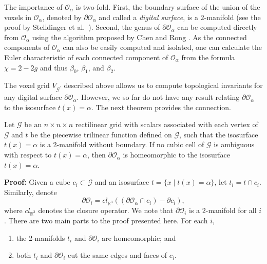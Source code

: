 The importance of $\mathcal{O}_\alpha$ is two-fold. First, the
boundary surface of the union of the voxels in $\mathcal{O}_\alpha$,
denoted by $\partial\mathcal{O}_\alpha$ and called a \emph{digital
  surface}, is a $2$-manifold (see the proof by Stelldinger et
al.~\cite{siqueira:2007}). Second, the genus of
$\partial\mathcal{O}_\alpha$ can be computed directly from
$\mathcal{O}_\alpha$ using the algorithm proposed by Chen and Rong
\cite{LiChen:2008}. As the
connected components of $\mathcal{O}_\alpha$ can also be easily
computed and isolated, one can calculate the Euler characteristic of
each connected component of $\mathcal{O}_\alpha$ from the formula
$\chi = 2 - 2g$ and thus $\beta_0$, $\beta_1$, and $\beta_2$.

The voxel grid $V_{\mathcal{G^\prime}}$ described above allows us to
compute topological invariants for any digital surface
$\partial\mathcal{O}_\alpha$. However, we so far do not have any
result relating $\partial\mathcal{O}_\alpha$ to the isosurface
$t(x)=\alpha$.  The next theorem provides the connection.

\begin{thm}
Let $\mathcal{G}$ be an $n\times n\times n$ rectilinear grid with scalars
associated with each vertex of $\mathcal{G}$ and $t$ be the piecewise trilinear 
function defined on $\mathcal{G}$, such that the isosurface $t(x)=\alpha$ is a
2-manifold without boundary. If no cubic cell of $\mathcal{G}$ is
ambiguous with respect to $t(x)=\alpha$, then $\partial\mathcal{O}_\alpha$
is homeomorphic to the isosurface $t(x)=\alpha$.
\label{thm:topological_equivalence_trilinear}
\end{thm}
{\bf Proof:} Given a cube $c_i \subset \mathcal{G}$ and an isosurface
 $t = \{x \;|\; t(x) = \alpha\}$, let $t_i = t \cap c_i$.  Similarly,
denote
\[\partial \mathcal{O}_i =  cl_{\mathbb{R}^3} \left( (\partial \mathcal{O}_\alpha \cap c_i) - \partial c_i  \right),\]
where $cl_{\mathbb{R}^3}$ denotes the closure operator. We note that
$\partial \mathcal{O}_i$ is a 2-manifold for all $i$
\cite{SPB04,siqueira:2007}.  There are two main parts to the proof
presented here. For each $i$,
\begin{enumerate}[topsep=0px,partopsep=0px,itemsep=0px,parsep=0px]
\item the 2-manifolds $t_i$ and $\partial \mathcal{O}_i$ are homeomorphic; and
\item both $t_i$ and $\partial \mathcal{O}_i$ cut the same edges and faces of $c_i$.
\end{enumerate}

